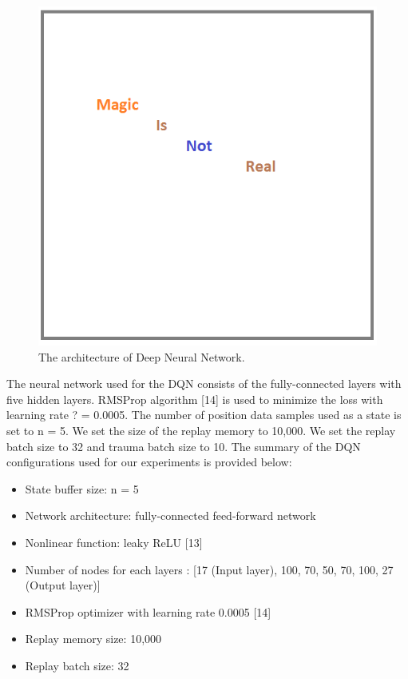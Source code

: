 \begin{figure}[h]
\centering
\includegraphics[width=1.0\textwidth]{figs/magic}
\caption{The architecture of Deep Neural Network.}
\label{fig:dnn}
\end{figure}

The neural network used for the DQN consists of the fully-connected layers with five hidden layers. RMSProp algorithm [14] is used to minimize the loss with learning rate ? = 0.0005. The number of position data samples used as a state is set to n = 5. We set the size of the replay memory to 10,000. We set the replay batch size to 32 and trauma batch size to 10. The summary of the DQN configurations used for our experiments is provided below:

\begin{itemize}
\item State buffer size: n = 5
\item Network architecture: fully-connected feed-forward network
\item Nonlinear function: leaky ReLU [13]
\item Number of nodes for each layers : [17 (Input layer), 100, 70, 50, 70, 100, 27 (Output layer)]
\item RMSProp optimizer with learning rate 0.0005 [14]
\item Replay memory size: 10,000
\item Replay batch size: 32
\end{itemize}

